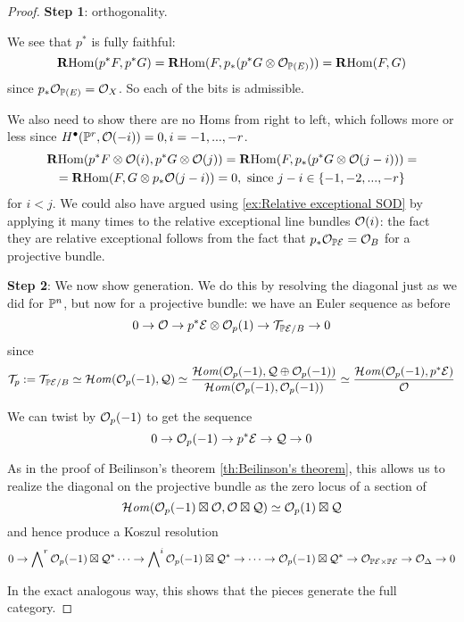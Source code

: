 \begin{proof}
    \textbf{Step 1}: orthogonality.

    We see that $p^*$ is fully faithful:
    \begin{equation*}
        \RHom(p^*F,p^*G) = \RHom(F,p_*(p^*G\otimes\O_{\P(E)})) = \RHom(F,G)
    \end{equation*}
    since $p_*\O_{\P(E)}=\O_X$. So each of the bits is admissible.

    We also need to show there are no Homs from right to left, which follows more or less since $H^\bullet(\P^r, \O(-i))=0, i=-1,...,-r$.
    \begin{gather*}
        \RHom(p^*F\otimes\O(i),p^*G\otimes\O(j))
            = \RHom(F,p_*(p^*G\otimes \O(j-i))) = \\
            = \RHom(F,G\otimes p_*\O(j-i)) = 0, \text{ since } j-i\in \{-1,-2,...,-r\}
    \end{gather*}
for $i<j$. We could also have argued using \ref{ex:Relative exceptional SOD} by applying it many times to the relative exceptional line bundles $\O(i)$: the fact they are relative exceptional follows from the fact that $p_*\O_{\P\calE}=\O_B$ for a projective bundle.

\textbf{Step 2}: We now show generation. We do this by resolving the diagonal just as we did for $\P^n$, but now for a projective bundle: we have an Euler sequence as before $$0\rightarrow \O\rightarrow p^* \calE \otimes \O_{p}(1)\rightarrow \calT_{\P\calE/B}\rightarrow 0$$since $$\calT_p:=\calT_{\P\calE/B}\simeq \lHom(\O_{p}(-1),\mathcal{Q})\simeq \frac{\lHom(\O_{p}(-1),\mathcal{Q}\oplus \O_{p}(-1))}{\lHom (\O_{p}(-1), \O_{p}(-1))}\simeq \frac{\lHom(\O_{p}(-1), p^* \calE)}{ \O}$$

We can twist by $\O_p(-1)$ to get the sequence $$0\rightarrow \O_p(-1)\rightarrow p^* \calE \rightarrow \mathcal{Q}\rightarrow 0$$

As in the proof of Beilinson's theorem \ref{th:Beilinson's theorem}, this allows us to realize the diagonal on the projective bundle as the zero locus of a section of $$\lHom(\O_p(-1)\boxtimes \O, \O\boxtimes \mathcal{Q})\simeq \O_p(1) \boxtimes \mathcal{Q}$$
and hence produce a Koszul resolution $$0\rightarrow \bigwedge\nolimits^r \O_p(-1) \boxtimes \mathcal{Q}^*\dots\rightarrow \bigwedge\nolimits^i \O_p(-1) \boxtimes \mathcal{Q}^*\rightarrow \dots \rightarrow \O_p(-1) \boxtimes \mathcal{Q}^*\rightarrow \O_{\P\calE \times \P\calE}\rightarrow \O_{\Delta}\rightarrow 0$$

In the exact analogous way, this shows that the pieces generate the full category.
\end{proof}

